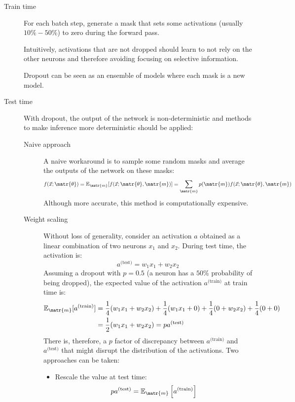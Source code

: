 \begin{description}
    \item[Train time] 
        For each batch step, generate a mask that sets some activations (usually $10\% - 50\%$) to zero during the forward pass.
        
        \begin{remark}
            Intuitively, activations that are not dropped should learn to not rely on the other neurons and therefore avoiding focusing on selective information.
        \end{remark}
        
        \begin{remark}
            Dropout can be seen as an ensemble of models where each mask is a new model.
        \end{remark}

    \item[Test time] 
        With dropout, the output of the network is non-deterministic and methods to make inference more deterministic should be applied:
        \begin{description}
            \item[Naive approach] 
                A naive workaround is to sample some random masks and average the outputs of the network on these masks:
                \[ f(\vec{x}; \matr{\theta}) = \mathbb{E}_\matr{m} [ f(\vec{x}; \matr{\theta}, \matr{m}) ] = \sum_\matr{m} p(\matr{m}) f(\vec{x}; \matr{\theta}, \matr{m}) \]
                Although more accurate, this method is computationally expensive.

            \item[Weight scaling] 
                Without loss of generality, consider an activation $a$ obtained as a linear combination of two neurons $x_1$ and $x_2$.
                During test time, the activation is:
                \[ a^\text{(test)} = w_1 x_1 + w_2 x_2 \]
                Assuming a dropout with $p=0.5$ (a neuron has a $50\%$ probability of being dropped), the expected value of the activation $a^\text{(train)}$ at train time is:
                \[  
                    \begin{split}
                        \mathbb{E}_\matr{m} [ a^\text{(train)} ] &= \frac{1}{4}(w_1 x_1 + w_2 x_2) + \frac{1}{4}(w_1 x_1 + 0) + \frac{1}{4}(0 + w_2 x_2) + \frac{1}{4}(0 + 0) \\
                            &= \frac{1}{2}(w_1 x_1 + w_2 x_2) = p a^\text{(test)}
                    \end{split}
                \]
                There is, therefore, a $p$ factor of discrepancy between $a^\text{(train)}$ and $a^\text{(test)}$ that might disrupt the distribution of the activations. Two approaches can be taken:
                \begin{itemize}
                    \item Rescale the value at test time:
                        \[ p a^\text{(test)} = \mathbb{E}_\matr{m} \left[ a^\text{(train)} \right] \]


\end{itemize}
\end{description}
\end{description}
